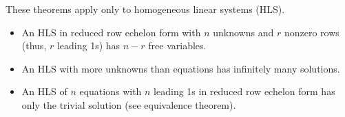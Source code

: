 \documentclass[12pt]{article}
\begin{document}
These theorems apply only to homogeneous linear systems (HLS).
\begin{itemize}
    \item An HLS in reduced row echelon form with $n$ unknowns and $r$ nonzero rows (thus, $r$ leading 1s) has $n - r$ free variables.
    \item An HLS with more unknowns than equations has infinitely many solutions.
    \item An HLS of $n$ equations with $n$ leading 1s in reduced row echelon form has only the trivial solution (see equivalence theorem).
\end{itemize}
\end{document}

